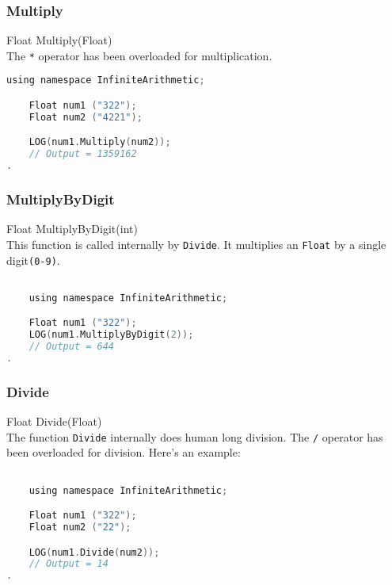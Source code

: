 \subsubsection{Multiply}
{\ttfamily \large Float Multiply(Float)} \\[2mm]
The \verb|*| operator has been overloaded for multiplication.
\vspace*{1em}
\begin{lstlisting}[language = C]	
	using namespace InfiniteArithmetic;

	Float num1 ("322");
	Float num2 ("4221");

	LOG(num1.Multiply(num2));
	// Output = 1359162
.
\end{lstlisting}
\vspace*{1em}


\subsubsection{MultiplyByDigit}
{\ttfamily \large Float MultiplyByDigit(int)} \\[2mm]
This function is called internally by \verb|Divide|. It multiplies an \verb|Float| by a single digit\verb|(0-9)|.
\vspace*{0em}
\begin{lstlisting}[language = C]

	using namespace InfiniteArithmetic;

	Float num1 ("322");
	LOG(num1.MultiplyByDigit(2));
	// Output = 644
.
\end{lstlisting}


\subsubsection{Divide}
{\ttfamily \large Float Divide(Float)} \\[2mm]
The function \verb|Divide| internally does human long division. The \verb|/| operator has been overloaded for division. Here's an example:
\vspace*{1em}
\begin{lstlisting}[language = C]	

	using namespace InfiniteArithmetic;

	Float num1 ("322");
	Float num2 ("22");

	LOG(num1.Divide(num2));
	// Output = 14
.
\end{lstlisting}
\vspace*{1em}


